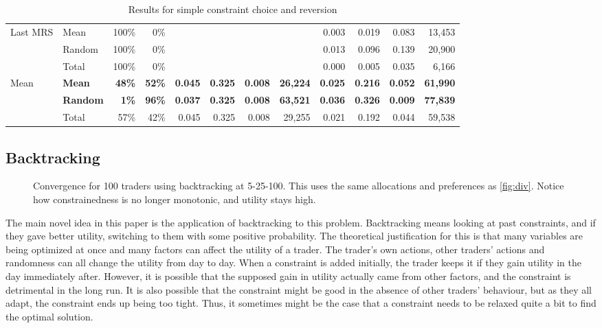 \documentclass[12pt,a4paper,titlepage]{article}
\begin{document}
\begin{sidewaystable}
\begin{tabular}{ll|rr|rrrr|rrrr}
    \multicolumn{ 1}{l}{Last MRS} & Mean & 100\% & 0\% &  &  & &  & 0.003 & 0.019 & 0.083 & 13,453 \\
    \multicolumn{ 1}{l}{} & Random & 100\% & 0\% &  &  &  &  & 0.013 & 0.096 & 0.139 & 20,900 \\
    \multicolumn{ 1}{l}{} & Total & 100\% & 0\% &  &  &  &  & 0.000 & 0.005 & 0.035 & 6,166 \\
    \multicolumn{ 1}{l}{Mean} & \textbf{Mean} & \textbf{48\%} & \textbf{52\%} & \textbf{0.045} & \textbf{0.325} & \textbf{0.008} & \textbf{26,224} & \textbf{0.025} & \textbf{0.216} & \textbf{0.052} & \textbf{61,990} \\
    \multicolumn{ 1}{l}{} & \textbf{Random} & \textbf{1\%} & \textbf{96\%} & \textbf{0.037} & \textbf{0.325} & \textbf{0.008} & \textbf{63,521} & \textbf{0.036} & \textbf{0.326} & \textbf{0.009} & \textbf{77,839} \\
    \multicolumn{ 1}{l}{} & Total & 57\% & 42\% & 0.045 & 0.325 & 0.008 & 29,255 & 0.021 & 0.192 & 0.044 & 59,538 \\
  \end{tabular}
\caption{Results for simple constraint choice and reversion}
\label{tab:simple}
\end{sidewaystable}


\subsection{Backtracking}\label{backtrack}

\begin{figure}[H]
    \centering
    
    \caption{
      Convergence for 100 traders using backtracking at 5-25-100.
      This uses the same allocations and preferences as \ref{fig:div}.
      Notice how constrainedness is no longer monotonic, and utility stays high.
    }
    \label{fig:back}
\end{figure}

The main novel idea in this paper is the application of backtracking to this problem.
Backtracking means looking at past constraints, and if they gave better utility, switching to them with some positive probability.
The theoretical justification for this is that many variables are being optimized at once and many factors can affect the utility of a trader.
The trader's own actions, other traders' actions and randomness can all change the utility from day to day.
When a constraint is added initially, the trader keeps it if they gain utility in the day immediately after.
However, it is possible that the supposed gain in utility actually came from other factors, and the constraint is detrimental in the long run.
It is also possible that the constraint might be good in the absence of other traders' behaviour, but as they all adapt, the constraint ends up being too tight.
Thus, it sometimes might be the case that a constraint needs to be relaxed quite a bit to find the optimal solution.
\end{document}
